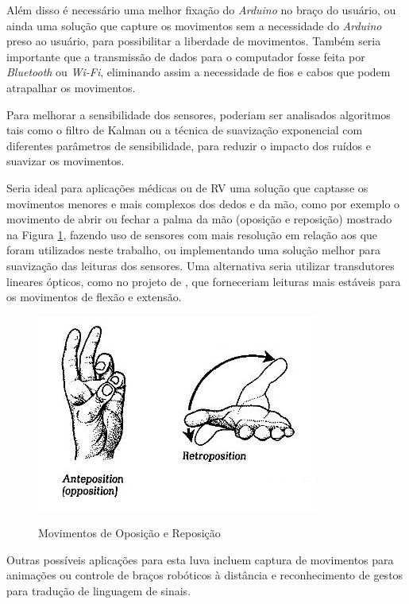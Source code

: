 Além disso é necessário uma melhor fixação do \textit{Arduino} no braço do usuário, ou ainda uma solução que capture os movimentos sem a necessidade do \textit{Arduino} preso ao usuário, para possibilitar a liberdade de movimentos. Também seria importante que a transmissão de dados para o computador fosse feita por \textit{Bluetooth} ou \textit{Wi-Fi}, eliminando assim a necessidade de fios e cabos que podem atrapalhar os movimentos.

Para melhorar a sensibilidade dos sensores, poderiam ser analisados algoritmos tais como o filtro de Kalman ou a técnica de suavização exponencial com diferentes parâmetros de sensibilidade, para reduzir o impacto dos ruídos e suavizar os movimentos.

Seria ideal para aplicações médicas ou de \ac{RV} uma solução que captasse os movimentos menores e mais complexos dos dedos e da mão, como por exemplo o movimento de abrir ou fechar a palma da mão (oposição e reposição) mostrado na Figura \ref{fig:oprep}, fazendo uso de sensores com mais resolução em relação aos que foram utilizados neste trabalho, ou implementando uma solução melhor para suavização das leituras dos sensores. Uma alternativa seria utilizar transdutores lineares ópticos, como no projeto de , que forneceriam leituras mais estáveis para os movimentos de flexão e extensão.

\begin{figure}[H]
  \setlength{\abovecaptionskip}{0pt}
  \setlength{\belowcaptionskip}{0pt}
  \caption[Movimentos de Oposição e Reposição]{Movimentos de Oposição e Reposição}
  \centering
  \includegraphics[width=.5\textwidth]{imagem/thumb-workings.jpg}
  \captionsetup{justification=centering}
  \label{fig:oprep}
\end{figure}

Outras possíveis aplicações para esta luva incluem captura de movimentos para animações ou controle de braços robóticos à distância e reconhecimento de gestos para tradução de linguagem de sinais.

